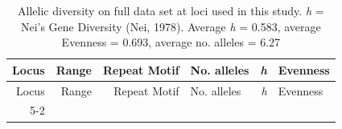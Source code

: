 \documentclass[fleqn,10pt,lineno]{wlpeerj} %
\theoremstyle{definition}
\theoremstyle{definition}
\theoremstyle{definition}
\theoremstyle{remark}
\begin{document}
\begin{longtable}[]{@{}rrrlrl@{}}
\caption{\label{tab:locus-stats} Allelic diversity on full data set at loci
used in this study. \emph{h} = Nei's Gene Diversity (Nei, 1978). Average
\emph{h} = 0.583, average Evenness = 0.693, average no. alleles =
6.27}\tabularnewline
\toprule
\begin{minipage}[b]{0.08\columnwidth}\raggedleft\strut
Locus\strut
\end{minipage} & \begin{minipage}[b]{0.10\columnwidth}\raggedleft\strut
Range\strut
\end{minipage} & \begin{minipage}[b]{0.29\columnwidth}\raggedleft\strut
Repeat Motif\strut
\end{minipage} & \begin{minipage}[b]{0.14\columnwidth}\raggedright\strut
No. alleles\strut
\end{minipage} & \begin{minipage}[b]{0.06\columnwidth}\raggedleft\strut
\emph{h}\strut
\end{minipage} & \begin{minipage}[b]{0.10\columnwidth}\raggedright\strut
Evenness\strut
\end{minipage}\tabularnewline
\midrule
\endfirsthead
\toprule
\begin{minipage}[b]{0.08\columnwidth}\raggedleft\strut
Locus\strut
\end{minipage} & \begin{minipage}[b]{0.10\columnwidth}\raggedleft\strut
Range\strut
\end{minipage} & \begin{minipage}[b]{0.29\columnwidth}\raggedleft\strut
Repeat Motif\strut
\end{minipage} & \begin{minipage}[b]{0.14\columnwidth}\raggedright\strut
No. alleles\strut
\end{minipage} & \begin{minipage}[b]{0.06\columnwidth}\raggedleft\strut
\emph{h}\strut
\end{minipage} & \begin{minipage}[b]{0.10\columnwidth}\raggedright\strut
Evenness\strut
\end{minipage}\tabularnewline
\midrule
\endhead
\begin{minipage}[t]{0.08\columnwidth}\raggedleft\strut
5-2\strut
\end{minipage} & \begin{minipage}[t]{0.10\columnwidth}\raggedleft\strut

\end{minipage}
\end{longtable}
\end{document}
